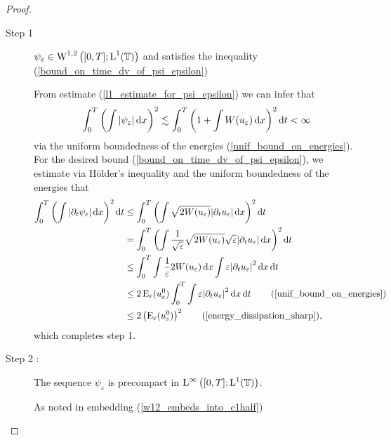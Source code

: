 \begin{proof}
	\begin{description}
		\item[Step 1] $ \psi_{ \varepsilon } \in \operatorname{W}^{ 1 , 2 } \left( [ 0 , T ] ; \operatorname{L}^{ 1 } ( \operatorname{\mathbb{T}} ) \right) $ and satisfies the inequality (\ref{bound_on_time_dv_of_psi_epsilon})
		
		From estimate (\ref{l1_estimate_for_psi_epsilon}) we can infer that
		\begin{equation*}
			\int_{ 0 }^{ T }
				\left(
					\int
						\abs{ \psi_{ \varepsilon } }
					\dd{ x }
				\right)^{ 2 }
			\lesssim
			\int_{ 0 }^{ T }
				\left(
					1 + \int W ( u_{ \varepsilon } ) \dd{ x }
				\right)^{ 2 }
			\dd{ t } 
			<
			\infty
		\end{equation*}
		via the uniform boundedness of the energies (\ref{unif_bound_on_energies}). For the desired bound (\ref{bound_on_time_dv_of_psi_epsilon}), we estimate via Hölder's inequality and the uniform boundedness of the energies that
		\begin{align*}
			\int_{ 0 }^{ T }
				\left(
					\int
						\abs{ 
							\partial_{ t } \psi_{ \varepsilon }
						}
					\dd{ x }
				\right)^{ 2 }
			\dd{ t }
			& \leq
			\int_{ 0 }^{ T }
				\left(
					\int
						\sqrt{ 2 W ( u_{ \varepsilon } ) }
						\abs{ \partial_{ t } u_{ \varepsilon } }
					\dd{ x }
				\right)^{ 2 }
			\dd{ t }
			\\
			& =
			\int_{ 0 }^{ T }
				\left(
					\int
						\frac{ 1 }{ \sqrt{\varepsilon } } \sqrt{ 2 W ( u_{ \varepsilon } ) }
						\sqrt{ \varepsilon } \abs{ \partial_{ t } u_{ \varepsilon } }
					\dd{ x }
				\right)^{ 2 }
			\dd{ t }
			\\
			& \leq
			\int_{ 0 }^{ T }
				\int
					\frac{ 1 }{ \varepsilon }
					2 W ( u_{ \varepsilon } )
				\dd{ x }
				\int
					\varepsilon
					\abs{ \partial_{ t } u_{ \varepsilon } }^{ 2 }
				\dd{ x }
			\dd{ t }
			\\
			& \leq
			2 \energy_{ \varepsilon } ( u_{ \varepsilon }^{ 0 } )
			\int_{ 0 }^{ T }
				\int
					\varepsilon
					\abs{ \partial_{ t } u_{ \varepsilon } }^{ 2 }
				\dd{ x }
			\dd{ t }
			\tag{\ref{unif_bound_on_energies}}
			\\
			& \leq
			2 \left(\energy_{ \varepsilon } ( u_{ \varepsilon }^{ 0 } )\right)^{ 2 }
			\tag{\ref{energy_dissipation_sharp}},
		\end{align*}
		which completes step 1.
		
		\item[Step 2 :] The sequence $ \psi_{ \varepsilon } $ is precompact in $ \operatorname{L}^{ \infty } \left( [ 0 , T ] ; \operatorname{L}^{ 1 } ( \operatorname{\mathbb{T}} ) \right) $.
		
		As noted in embedding (\ref{w12_embeds_into_c1half})
	\end{description}
\end{proof}
